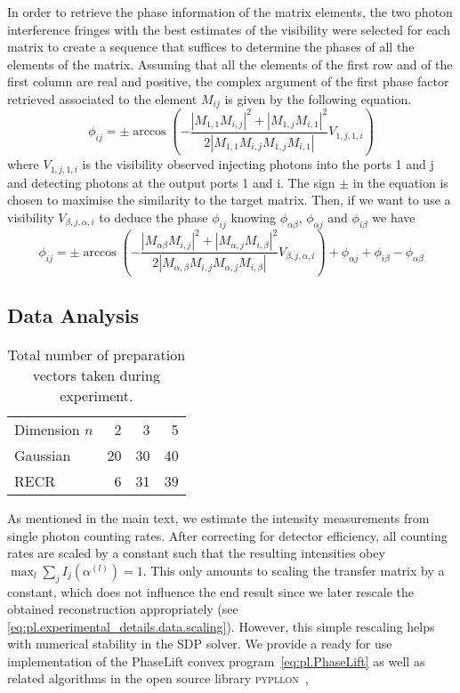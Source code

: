 In order to retrieve the phase information of the matrix elements, the two photon interference fringes with the best estimates of the visibility were selected for each matrix to create a sequence that suffices to determine the phases of all the elements of the matrix.
Assuming that all the elements of the first row and of the first column are real and positive, the complex argument of the first phase factor retrieved associated to the element $M_{ij}$ is given by the following equation.
\[
\phi_{ij}=\pm  \arccos\left( - \frac{|M_{1,1}M_{i,j}|^2+|M_{1,j}M_{i,1}|^2}{2 |M_{1,1}M_{i,j}M_{1,j}M_{i,1}|} V_{1,j,1,i} \right)
\]
where $V_{1,j,1,i}$ is the visibility observed injecting photons into the ports 1 and j and detecting photons at the output ports 1 and i.
The sign $\pm$ in the equation is chosen to maximise the similarity to the target matrix.
Then, if we want to use a visibility $V_{\beta,j,\alpha,i}$ to deduce the phase $\phi_{ij}$ knowing $\phi_{\alpha \beta}$, $\phi_{\alpha j}$ and $\phi_{i \beta}$ we have
\[
\phi_{ij}=\pm   \arccos\left( - \frac{|M_{\alpha \beta}M_{i,j}|^2+|M_{\alpha,j}M_{i,\beta}|^2}{2 |M_{\alpha,\beta}M_{i,j}M_{\alpha,j}M_{i,\beta}|} V_{\beta,j,\alpha,i} \right) +\phi_{\alpha j} +\phi_{i \beta} -\phi_{\alpha \beta}
\]



\subsection{Data Analysis}%
\label{sub:pl.data_analysis}

\begin{table}
  \begin{tabular}{l | r r r}
    Dimension $n$ & 2 & 3 & 5 \\
    Gaussian & 20 & 30 & 40 \\
    RECR & 6 & 31 & 39 \\
  \end{tabular}
  \caption{%
    \label{tab:measurements}
    Total number of preparation vectors taken during experiment.
  }
\end{table}

As mentioned in the main text, we estimate the intensity measurements from single photon counting rates.
After correcting for detector efficiency, all counting rates are scaled by a constant such that the resulting intensities obey $\max_l \sum_j I_j(\alpha^{(l)}) = 1$.
This only amounts to scaling the transfer matrix by a constant, which does not influence the end result since we later rescale the obtained reconstruction appropriately (see \cref{eq:pl.experimental_details.data.scaling}).
However, this simple rescaling helps with numerical stability in the SDP solver.
We provide a ready for use implementation of the PhaseLift convex program~\eqref{eq:pl.PhaseLift} as well as related algorithms in the open source library \textsc{pypllon}~\cite{Suess_2017_Pypllon},

